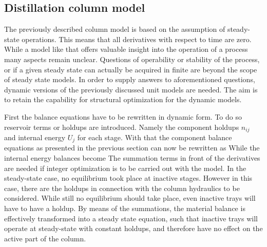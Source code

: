 
\subsection{Distillation column model}
    The previously described column model is based on the assumption of steady-state operations. This means that all
    derivatives with respect to time are zero. While a model like that offers valuable insight into the operation
    of a process many aspects remain unclear. Questions of operability or stability of the process, or if a given
    steady state can actually be acquired in finite are beyond the scope of steady state models. In order to
    supply answers to aforementioned questions, dynamic versions of the previously discussed unit models
    are needed. The aim is to retain the capability for structural optimization for the dynamic models.

    First the balance equations have to be rewritten in dynamic form. To do so reservoir terms or holdups
    are introduced. Namely the component holdups $n_{ij}$ and internal energy $U_j$ for each stage.
    With that the component balance equations as presented in the previous section can now be rewritten as
    While the internal energy balances become
    The summation terms in front of the derivatives are needed if integer optimization is to be carried out with the model.
    In the steady-state case, no equilibrium took place at inactive stages. However in this case, there are the holdups
    in connection with the column hydraulics to be considered. While still no equilibrium should take place,
    even inactive trays will have to have a holdup. By means of the summations, the material balance is
    effectively transformed into a steady state equation, such that inactive trays will operate at steady-state
    with constant holdups, and therefore have no effect on the active part of the column.

